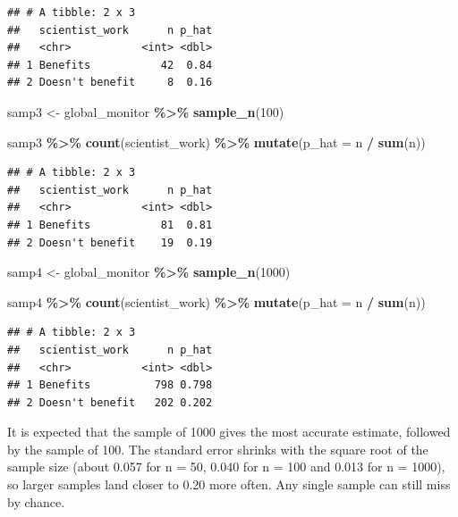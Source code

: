 \documentclass[
]{article}
\newenvironment{Shaded}{\begin{snugshade}}{\end{snugshade}}
\newcommand{\AttributeTok}[1]{\textcolor[rgb]{0.13,0.29,0.53}{#1}}
\newcommand{\DecValTok}[1]{\textcolor[rgb]{0.00,0.00,0.81}{#1}}
\newcommand{\FunctionTok}[1]{\textcolor[rgb]{0.13,0.29,0.53}{\textbf{#1}}}
\newcommand{\NormalTok}[1]{#1}
\newcommand{\OtherTok}[1]{\textcolor[rgb]{0.56,0.35,0.01}{#1}}
\newcommand{\SpecialCharTok}[1]{\textcolor[rgb]{0.81,0.36,0.00}{\textbf{#1}}}
\begin{document}
\begin{verbatim}
## # A tibble: 2 x 3
##   scientist_work      n p_hat
##   <chr>           <int> <dbl>
## 1 Benefits           42  0.84
## 2 Doesn't benefit     8  0.16
\end{verbatim}

\begin{Shaded}
\begin{Highlighting}[]
\NormalTok{samp3 }\OtherTok{\textless{}{-}}\NormalTok{ global\_monitor }\SpecialCharTok{\%\textgreater{}\%}
  \FunctionTok{sample\_n}\NormalTok{(}\DecValTok{100}\NormalTok{)}

\NormalTok{samp3 }\SpecialCharTok{\%\textgreater{}\%}
  \FunctionTok{count}\NormalTok{(scientist\_work) }\SpecialCharTok{\%\textgreater{}\%}
  \FunctionTok{mutate}\NormalTok{(}\AttributeTok{p\_hat =}\NormalTok{ n }\SpecialCharTok{/} \FunctionTok{sum}\NormalTok{(n))}
\end{Highlighting}
\end{Shaded}

\begin{verbatim}
## # A tibble: 2 x 3
##   scientist_work      n p_hat
##   <chr>           <int> <dbl>
## 1 Benefits           81  0.81
## 2 Doesn't benefit    19  0.19
\end{verbatim}

\begin{Shaded}
\begin{Highlighting}[]
\NormalTok{samp4 }\OtherTok{\textless{}{-}}\NormalTok{ global\_monitor }\SpecialCharTok{\%\textgreater{}\%}
  \FunctionTok{sample\_n}\NormalTok{(}\DecValTok{1000}\NormalTok{)}

\NormalTok{samp4 }\SpecialCharTok{\%\textgreater{}\%}
  \FunctionTok{count}\NormalTok{(scientist\_work) }\SpecialCharTok{\%\textgreater{}\%}
  \FunctionTok{mutate}\NormalTok{(}\AttributeTok{p\_hat =}\NormalTok{ n }\SpecialCharTok{/} \FunctionTok{sum}\NormalTok{(n))}
\end{Highlighting}
\end{Shaded}

\begin{verbatim}
## # A tibble: 2 x 3
##   scientist_work      n p_hat
##   <chr>           <int> <dbl>
## 1 Benefits          798 0.798
## 2 Doesn't benefit   202 0.202
\end{verbatim}

It is expected that the sample of 1000 gives the most accurate estimate,
followed by the sample of 100. The standard error shrinks with the
square root of the sample size (about 0.057 for n = 50, 0.040 for n =
100 and 0.013 for n = 1000), so larger samples land closer to 0.20 more
often. Any single sample can still miss by chance.
\end{document}
